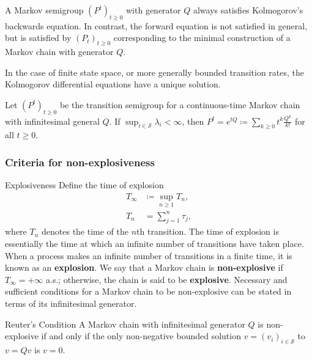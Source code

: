 \begin{rmk}{}{}
A Markov semigroup \((P^t)_{t \geq 0}\) with generator \(Q\) always satisfies Kolmogorov's backwards equation. In contrast, the forward equation is not satisfied in general, but is satisfied by \((P_t)_{t \geq 0}\) corresponding to the minimal construction of a Markov chain with generator \(Q\). 

In the case of finite state space, or more generally bounded transition
rates, the Kolmogorov differential equations have a unique solution.
\end{rmk}

\begin{cor}{}{}
Let \((P^t)_{t \geq 0}\) be the transition semigroup for a continuous-time Markov chain with infinitesimal general \(Q\). If \(\sup _{i \in  \mathcal{S} }\lambda _{i} < \infty  \), then \(P^t = e^{tQ}\coloneqq \sum_{k \geq 0}t^k \frac{Q^k}{k!}   \) for all \(t \geq 0 \). 
\end{cor}

\subsubsection{Criteria for non-explosiveness}

\begin{defn}{Explosiveness}{}
Define the time of explosion
\begin{align*}
    T_{ \infty }& \coloneqq \sup _{n \geq 1}T_{n}, \\
    T_{n} & = \sum_{j = 1}^n \tau _{j} ,
\end{align*}
where \(T_{n}   \) denotes the time of the \(n\)th transition. The time of explosion is essentially the time at which an infinite number of transitions have taken place. When a process makes an infinite number of transitions in a finite time, it is known as an \textbf{explosion}. We say that a Markov chain is \textbf{non-explosive} if \(T_ \infty  = + \infty \) a.s.; otherwise, the chain is said to be \textbf{explosive}. Necessary and sufficient conditions for a Markov chain to be non-explosive can be stated in terms of its infinitesimal generator.
\end{defn}

\begin{thrm}{Reuter's Condition}{}
A Markov chain with infinitesimal generator \(Q\) is non-explosive if and only if the only non-negative bounded solution \(v = (v_{i} )_{i \in  \mathcal{S} }\) to \(v = Qv\) is \(v = 0\). 
\end{thrm}